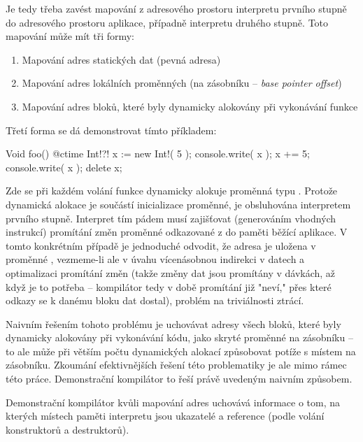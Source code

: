 Je tedy třeba zavést mapování z adresového prostoru interpretu prvního stupně do adresového prostoru aplikace, případně interpretu druhého stupně. Toto mapování může mít tři formy:
\begin{enumerate}
	\item Mapování adres statických dat (pevná adresa)
	\item Mapování adres lokálních proměnných (na zásobníku -- \textit{base pointer offset})
	\item Mapování adres \ctime bloků, které byly dynamicky alokovány při vykonávání \nonctime funkce
\end{enumerate}

Třetí forma se dá demonstrovat tímto příkladem:
\begin{code}
Void foo() {
	@ctime Int!?! x := new Int!( 5 );
	console.write( x );
	x += 5;
	console.write( x );
	delete x;
}
\end{code}

Zde se při každém volání funkce  dynamicky alokuje proměnná typu . Protože dynamická alokace je součástí inicializace \ctime proměnné, je obsluhována interpretem prvního stupně. Interpret tím pádem musí zajišťovat (generováním vhodných instrukcí) promítání změn proměnné odkazované z  do paměti běžící aplikace. V tomto konkrétním případě je jednoduché odvodit, že adresa je uložena v proměnné , vezmeme-li ale v úvahu vícenásobnou indirekci v \ctime datech a optimalizaci promítání změn (takže změny dat jsou promítány v dávkách, až když je to potřeba -- kompilátor tedy v době promítání již "neví," přes které odkazy se k danému bloku dat dostal), problém na triviálnosti ztrácí.

Naivním řešením tohoto problému je uchovávat adresy všech bloků, které byly dynamicky alokovány při vykonávání \ctime kódu, jako skryté proměnné na zásobníku -- to ale může při větším počtu dynamických alokací způsobovat potíže s místem na zásobníku. Zkoumání efektivnějších řešení této problematiky je ale mimo rámec této práce. Demonstrační kompilátor to řeší právě uvedeným naivním způsobem.

Demonstrační kompilátor kvůli mapování adres uchovává informace o tom, na kterých místech paměti interpretu jsou ukazatelé a reference (podle volání konstruktorů a destruktorů). 

